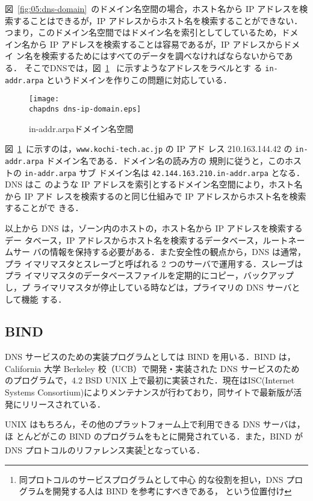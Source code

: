 図~\ref{fig:05:dns-domain}~のドメイン名空間の場合，ホスト名から IP アドレスを検
索することはできるが，IP アドレスからホスト名を検索することができない．
つまり，このドメイン名空間ではドメイン名を索引としてしているため，ドメ
イン名から IP アドレスを検索することは容易であるが，IP アドレスからドメイ
ン名を検索するためにはすべてのデータを調べなければならないからである．
そこでDNSでは，図~\ref{fig:05:dns-ip-domain}~ に示すようなアドレスをラベルとす
る \texttt{in-addr.arpa} というドメインを作りこの問題に対応している．

  \begin{figure}[hbtp]
   \begin{center}
    \texttt{[image: \\chapdns dns-ip-domain.eps]}
    \vspace*{1zh}
    \caption{in-addr.arpaドメイン名空間}
   \label{fig:05:dns-ip-domain}
   \end{center}
  \end{figure}

図~\ref{fig:05:dns-ip-domain}~に示すのは，\verb|www.kochi-tech.ac.jp| の IP アド
レス 210.163.144.42 の \texttt{in-addr.arpa} ドメイン名である．ドメイン名の読み方の
規則に従うと，このホストの \texttt{in-addr.arpa} サブ
ドメイン名は \texttt{42.144.163.210.in-addr.arpa} となる．DNS はこ
のような IP アドレスを索引とするドメイン名空間により，ホスト名から IP アド
レスを検索するのと同じ仕組みで IP アドレスからホスト名を検索することがで
きる．

以上から DNS は，ゾーン内のホストの，ホスト名から IP アドレスを検索するデー
タベース，IP アドレスからホスト名を検索するデータベース，ルートネームサー
バの情報を保持する必要がある．また安全性の観点から，DNS は通常，プラ
イマリマスタとスレーブと呼ばれる 2 つのサーバで運用する．スレーブはプラ
イマリマスタのデータベースファイルを定期的にコピー，バックアップし，プ
ライマリマスタが停止している時などは，プライマリの DNS サーバとして機能
する．

\subsection*{BIND}

DNS サービスのための実装プログラムとしては BIND を用いる．BIND は，
California 大学 Berkeley 校（UCB）で開発・実装された DNS サービスのため
のプログラムで，4.2 BSD UNIX 上で最初に実装された．現在はISC(Internet
Systems Consortium)によりメンテナンスが行わており，同サイトで最新版が活
発にリリースされている．

UNIX はもちろん，その他のプラットフォーム上で利用できる DNS サーバは，ほ
とんどがこの BIND のプログラムをもとに開発されている．また，BIND が DNS
プロトコルのリファレンス実装\footnote{同プロトコルのサービスプログラムとして中心
的な役割を担い，DNS プログラムを開発する人は BIND を参考にすべきである，
という位置付け}となっている．

